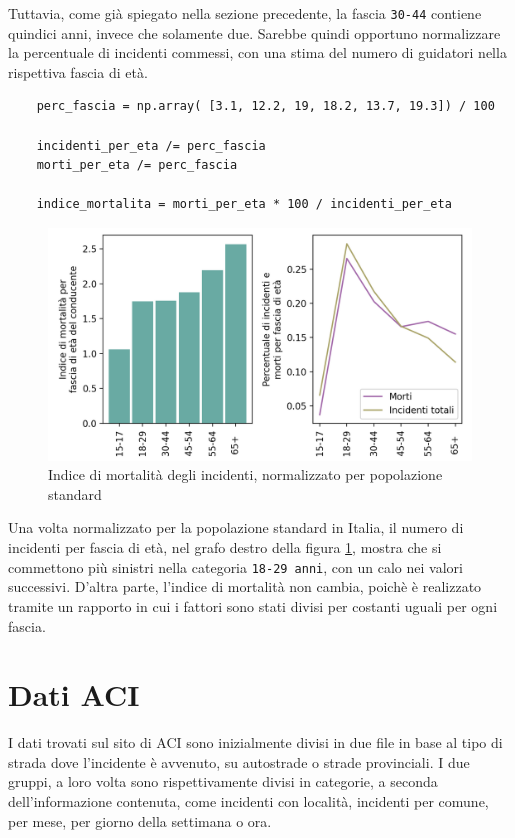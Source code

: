 \documentclass[a4paper,12pt]{report}
\newcommand{\columnstyle}[1]{\texttt{#1}}
\begin{document}
Tuttavia, come già spiegato nella sezione precedente, la fascia \columnstyle{30-44} 
contiene quindici anni, invece che solamente due. Sarebbe quindi opportuno 
normalizzare la percentuale di incidenti commessi, con una stima del numero di 
guidatori nella rispettiva fascia di età.

\begin{lstlisting}
    perc_fascia = np.array( [3.1, 12.2, 19, 18.2, 13.7, 19.3]) / 100

    incidenti_per_eta /= perc_fascia
    morti_per_eta /= perc_fascia

    indice_mortalita = morti_per_eta * 100 / incidenti_per_eta
\end{lstlisting}

\begin{figure}
    \includegraphics[width=\linewidth]{../src/incidenti/incidenti_senza_coords/mortalita/indice_mort_norm.png}
    \caption{Indice di mortalità degli incidenti, normalizzato per popolazione standard}
    \label{fig:indice-mort-norm}
\end{figure}

Una volta normalizzato per la popolazione standard in Italia, il numero di incidenti per 
fascia di età, nel grafo destro della figura \ref{fig:indice-mort-norm}, mostra che  
si commettono più sinistri nella categoria \columnstyle{18-29 anni}, 
con un calo nei valori successivi.
D'altra parte, l'indice di mortalità non cambia, poichè è realizzato tramite 
un rapporto in cui i fattori sono stati divisi per costanti uguali per ogni fascia.

\section{Dati ACI}

I dati trovati sul sito di ACI sono inizialmente divisi in due file in 
base al tipo di strada dove l'incidente è avvenuto, 
su autostrade o strade provinciali.
I due gruppi, a loro volta sono rispettivamente divisi in categorie, a seconda 
dell'informazione contenuta, come incidenti con località, incidenti per 
comune, per mese, per giorno della settimana o ora.
\end{document}
